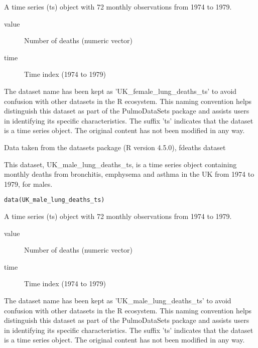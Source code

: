 \documentclass[a4paper]{book}
\begin{document}
%
\begin{Format}
A time series (ts) object with 72 monthly observations from 1974 to 1979.
\begin{description}

\item[value] Number of deaths (numeric vector)
\item[time] Time index (1974 to 1979)

\end{description}

\end{Format}
%
\begin{Details}
The dataset name has been kept as 'UK\_female\_lung\_deaths\_ts' to avoid confusion with other datasets
in the R ecosystem. This naming convention helps distinguish this dataset as part of the
PulmoDataSets package and assists users in identifying its specific characteristics.
The suffix 'ts' indicates that the dataset is a time series object. The original content has not been modified
in any way.
\end{Details}
%
\begin{Source}
Data taken from the datasets package (R version 4.5.0), fdeaths dataset
\end{Source}
%
\begin{Description}
This dataset, UK\_male\_lung\_deaths\_ts, is a time series object containing monthly deaths
from bronchitis, emphysema and asthma in the UK from 1974 to 1979, for males.
\end{Description}
%
\begin{Usage}
\begin{verbatim}
data(UK_male_lung_deaths_ts)
\end{verbatim}
\end{Usage}
%
\begin{Format}
A time series (ts) object with 72 monthly observations from 1974 to 1979.
\begin{description}

\item[value] Number of deaths (numeric vector)
\item[time] Time index (1974 to 1979)

\end{description}

\end{Format}
%
\begin{Details}
The dataset name has been kept as 'UK\_male\_lung\_deaths\_ts' to avoid confusion with other datasets
in the R ecosystem. This naming convention helps distinguish this dataset as part of the
PulmoDataSets package and assists users in identifying its specific characteristics.
The suffix 'ts' indicates that the dataset is a time series object. The original content has not been modified
in any way.
\end{Details}
\end{document}
